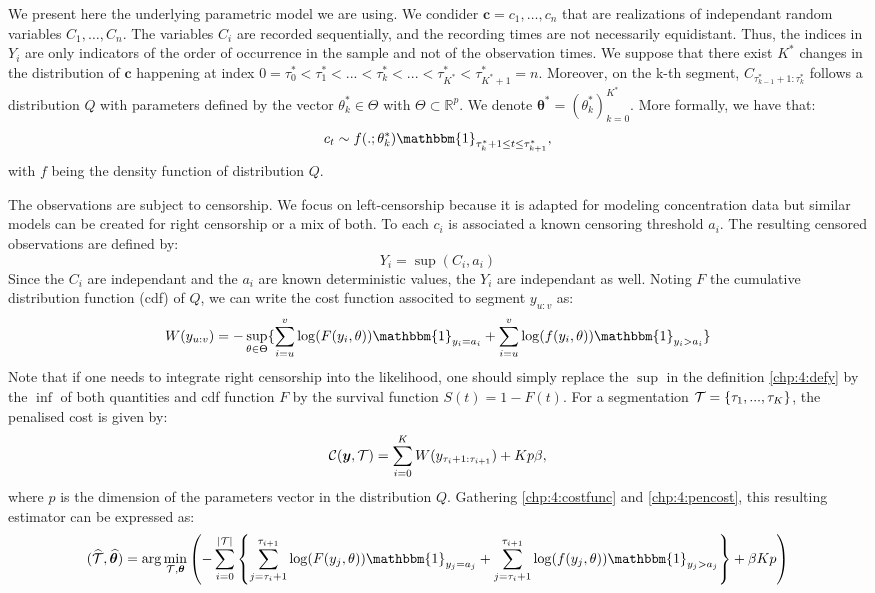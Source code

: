 We present here the underlying parametric model we are using. We condider $\bm c = c_1,\dots,c_n$ that are realizations of independant random variables $C_1,\dots,C_n$. The variables $C_i$ are recorded sequentially, and the recording times are not necessarily equidistant. Thus, the indices in $Y_i$ are only indicators of the order of occurrence in the sample and not of the observation times. We suppose that there exist $K^*$ changes in the distribution of $\bm c$ happening at index $0=\tau_0^*<\tau^*_1 <... < \tau^*_k <... < \tau^*_{K^*}<\tau^*_{K^*+1}=n$. Moreover, on the k-th segment, $C_{\tau^*_{k-1}+1:\tau^*_{k}}$ follows a distribution $Q$ with parameters defined by the vector $\theta^*_k\in\Theta$ with $\Theta\subset\mathbb{R}^p$. We denote $\bm{\theta^*} = (\theta^*_k)_{k=0}^{K^*}$. More formally, we have that:  
$$c_t \sim f(.;\theta^*_k)\mathbbm{1}_{\tau^*_{k}+1\leq t \leq \tau^*_{k+1}},$$
with $f$ being the density function of distribution $Q$.  


The observations are subject to censorship. We focus on left-censorship because it is adapted for modeling concentration data but similar models can be created for right censorship or a mix of both. To each $c_i$ is associated a known censoring threshold $a_i$. The resulting censored observations are defined by:  
\begin{equation}\label{chp:4:defy}
Y_i = \sup(C_i,a_i)
\end{equation}
Since the $C_i$ are independant and the $a_i$ are known deterministic values, the $Y_i$ are independant as well. Noting $F$ the cumulative distribution function (cdf) of $Q$, we can write the cost function associted to segment $y_{u:v}$ as:  
\begin{equation}\label{chp:4:costfunc}
W(y_{u:v}) = -\sup_{\theta \in \Theta}\{\sum_{i=u}^v\log(F(y_i,\theta))\mathbbm{1}_{y_i=a_i}+\sum_{i=u}^v\log(f(y_i,\theta))\mathbbm{1}_{y_i>a_i}\}
\end{equation}
Note that if one needs to integrate right censorship into the likelihood, one should simply replace the $\sup$ in the definition \ref{chp:4:defy} by the $\inf$ of both quantities and cdf function $F$ by the survival function $S(t)=1-F(t)$. 
For a segmentation ${\mathcal T} = \{\tau_1,...,\tau_K\}$, the penalised cost is given by: 
\begin{equation}\label{chp:4:pencost}
{\mathcal C}(\bm y,{\mathcal T})=\sum_{i=0}^{K}  W(y_{\tau_i+1:\tau_{i+1}}) + Kp\beta,
\end{equation}
where $p$ is the dimension of the parameters vector in the distribution $Q$. Gathering \ref{chp:4:costfunc} and \ref{chp:4:pencost}, this resulting estimator can be expressed as:  
\begin{equation}\label{chp:4:estim}
(\widehat{\TT},\widehat{\bm \theta}) = \arg\min_{\TT,\bm \theta} \left(- \sum_{i=0}^{\lvert \TT \rvert}  \left\{\sum_{j=\tau_i+1}^{\tau_{i+1}}\log(F(y_j,\theta))\mathbbm{1}_{y_j=a_j}+\sum_{j=\tau_i+1}^{\tau_{i+1}}\log(f(y_j,\theta))\mathbbm{1}_{y_j>a_j}\right\}+\beta Kp\right)
\end{equation}

